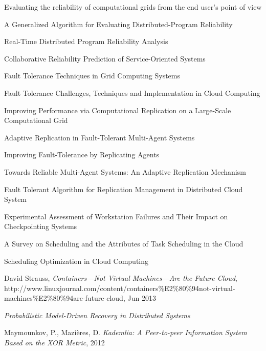 \documentclass{cslthse-msc}
\begin{document}
\begin{thebibliography}{50}
Evaluating the reliability of computational grids from the end user’s point of view

A Generalized Algorithm for Evaluating Distributed-Program Reliability

Real-Time Distributed Program Reliability Analysis

Collaborative Reliability Prediction of Service-Oriented Systems

Fault Tolerance Techniques in Grid Computing Systems

Fault Tolerance Challenges, Techniques and Implementation in Cloud Computing

Improving Performance via Computational Replication on a Large-Scale Computational Grid

Adaptive Replication in Fault-Tolerant Multi-Agent Systems

Improving Fault-Tolerance by Replicating Agents

Towards Reliable Multi-Agent Systems: An Adaptive Replication Mechanism

Fault Tolerant Algorithm for Replication Management in Distributed Cloud System

Experimental Assessment of Workstation Failures and Their Impact on Checkpointing Systems

A Survey on Scheduling and the Attributes of Task Scheduling in the Cloud

Scheduling Optimization in Cloud Computing

	David Strauss,
	\emph{Containers—Not Virtual Machines—Are the Future Cloud},
	http://www.linuxjournal.com/content/containers\%E2\%80\%94not-virtual-machines\%E2\%80\%94are-future-cloud,
	Jun 2013
	
	\emph{Probabilistic Model-Driven Recovery in Distributed Systems}
	
	Maymounkov, P., Mazières, D.
	\emph{Kademlia: A Peer-to-peer Information System Based on the XOR Metric}, 2012
	


\end{thebibliography}
\end{document}
